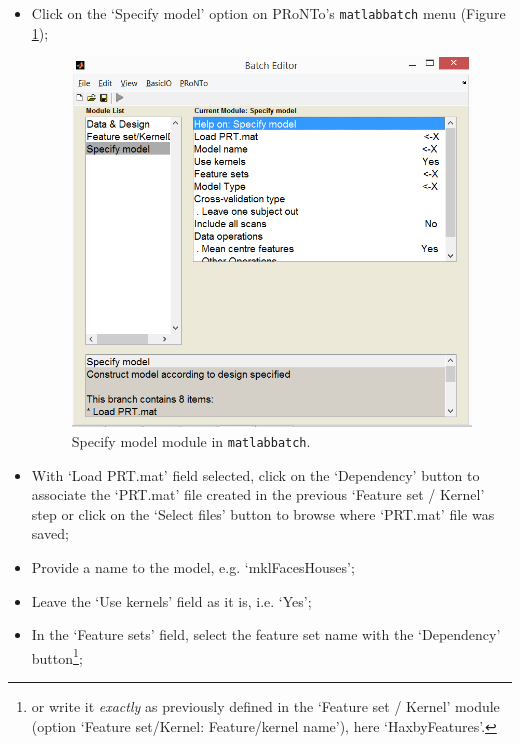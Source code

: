 \begin{itemize}

\item Click on the `Specify model' option on PRoNTo's {\tt matlabbatch} menu (Figure \ref{fig:batchSpecifyModelmkl});
	
	\begin{figure}[!h]
	\centering
		\includegraphics[scale=0.6]{images/Tutorial/mkl/batchSpecifyModelmkl.png}
	\caption{Specify model module in {\tt matlabbatch}.}
	\label{fig:batchSpecifyModelmkl}
\end{figure}
	
	\item With `Load PRT.mat' field selected, click on the `Dependency' button to associate the `PRT.mat' file created in the previous `Feature set / Kernel' step or click on the `Select files' button to browse where `PRT.mat' file was saved;
	
	\item Provide a name to the model, e.g. `mklFacesHouses'; 
	
	\item Leave the `Use kernels' field as it is, i.e. `Yes';
	
	\item In the `Feature sets' field, select the feature set name with the `Dependency' button\footnote{or write it {\it exactly} as previously defined in the `Feature set / Kernel' module (option `Feature set/Kernel: Feature/kernel name'), here `HaxbyFeatures'.};
	

\end{itemize}
